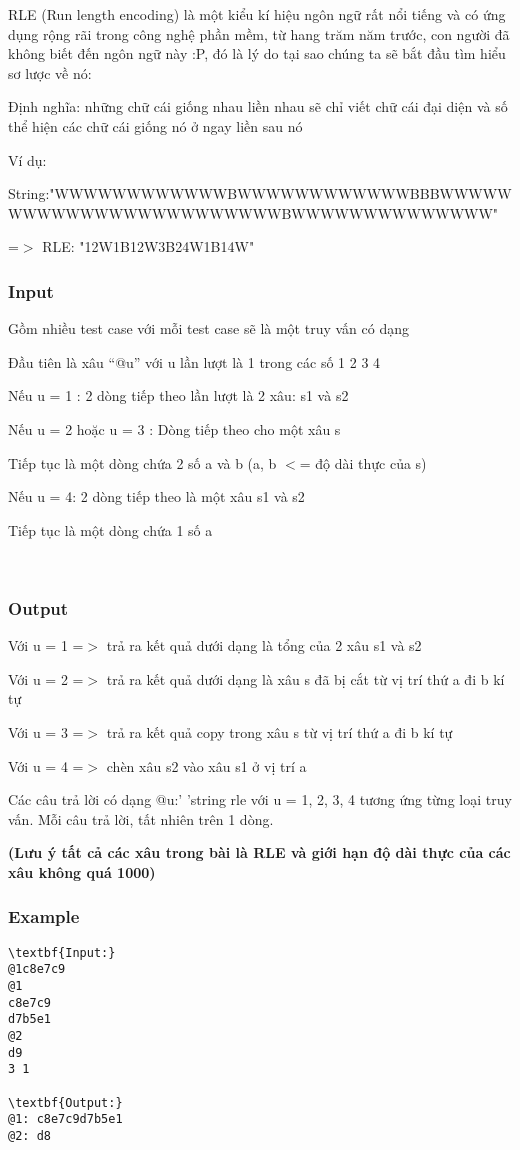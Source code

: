 

RLE (Run length encoding) là một kiểu kí hiệu ngôn ngữ rất nổi tiếng và có ứng dụng rộng rãi trong công nghệ phần mềm, từ hang trăm năm trước, con người đã không biết đến ngôn ngữ này :P, đó là lý do tại sao chúng ta sẽ bắt đầu tìm hiểu sơ lược về nó:

Định nghĩa: những chữ cái giống nhau liền nhau sẽ chỉ viết chữ cái đại diện và số thể hiện các chữ cái giống nó ở ngay liền sau nó

Ví dụ:

String:"WWWWWWWWWWWWBWWWWWWWWWWWWBBBWWWWWWWWWWWWWWWWWWWWWWWWBWWWWWWWWWWWWWW" \textbf{}

=$>$ RLE: "12W1B12W3B24W1B14W"

\subsubsection{Input}

Gồm nhiều test case với mỗi test case sẽ là một truy vấn có dạng

Đầu tiên là xâu “@u” với u lần lượt là 1 trong các số 1 2 3 4

Nếu u = 1 : 2 dòng tiếp theo lần lượt là 2 xâu: s1 và s2

Nếu u = 2 hoặc u = 3 : Dòng tiếp theo cho một xâu s

Tiếp tục là một dòng chứa 2 số a và b (a, b $<$= độ dài thực của s)

Nếu u = 4: 2 dòng tiếp theo là một xâu s1 và s2

Tiếp tục là một dòng chứa 1 số a

 

\subsubsection{Output}

Với u = 1 =$>$ trả ra kết quả dưới dạng là tổng của 2 xâu s1 và s2

Với u = 2 =$>$ trả ra kết quả dưới dạng là xâu s đã bị cắt từ vị trí thứ a đi b kí tự

Với u = 3 =$>$ trả ra kết quả copy trong xâu s từ vị trí thứ a đi b kí tự

Với u = 4 =$>$ chèn xâu s2 vào xâu s1 ở vị trí a

Các câu trả lời có dạng @u:' 'string rle với u = 1, 2, 3, 4 tương ứng từng loại truy vấn. Mỗi câu trả lời, tất nhiên trên 1 dòng.

\textbf{(Lưu ý tất cả các xâu trong bài là RLE và giới hạn độ dài thực của các xâu không quá 1000) }\textbf{}

\subsubsection{Example}
\begin{verbatim}
\textbf{Input:}
@1c8e7c9
@1
c8e7c9
d7b5e1
@2
d9
3 1

\textbf{Output:}
@1: c8e7c9d7b5e1
@2: d8\end{verbatim}